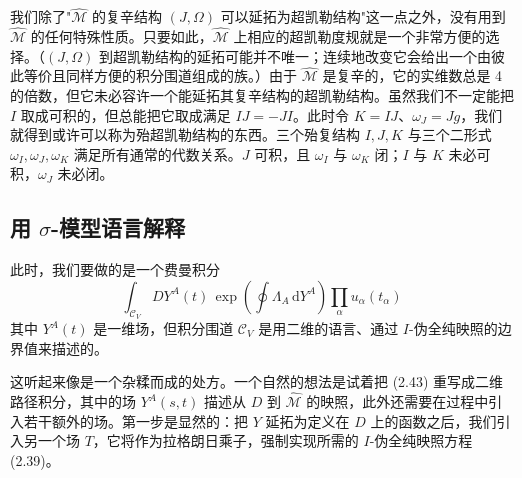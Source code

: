\documentclass[11pt,a4paper,UTF8]{ctexart}
\theoremstyle{plain}
\theoremstyle{definition}
\newcommand{\sigmatxt}{$\sigma$}
\begin{document}
我们除了"$\widehat{\mathcal{M}}$ 的复辛结构 $(J,\Omega)$ 可以延拓为超凯勒结构"这一点之外，没有用到 $\widehat{\mathcal{M}}$ 的任何特殊性质。只要如此，$\widehat{\mathcal{M}}$ 上相应的超凯勒度规就是一个非常方便的选择。（$(J,\Omega)$ 到超凯勒结构的延拓可能并不唯一；连续地改变它会给出一个由彼此等价且同样方便的积分围道组成的族。）由于 $\widehat{\mathcal{M}}$ 是复辛的，它的实维数总是 4 的倍数，但它未必容许一个能延拓其复辛结构的超凯勒结构。虽然我们不一定能把 $I$ 取成可积的，但总能把它取成满足 $IJ=-JI$。此时令 $K=IJ$、$\omega_J=Jg$，我们就得到或许可以称为殆超凯勒结构的东西。三个殆复结构 $I,J,K$ 与三个二形式 $\omega_I,\omega_J,\omega_K$ 满足所有通常的代数关系。$J$ 可积，且 $\omega_I$ 与 $\omega_K$ 闭；$I$ 与 $K$ 未必可积，$\omega_J$ 未必闭。


\subsection{用 \sigmatxt-模型语言解释}

此时，我们要做的是一个费曼积分
\begin{equation}
    \int_{\mathcal{C}_V} DY^A(t)\,\exp\left(\oint \Lambda_A\,\mathrm{d}Y^A\right)\prod_\alpha u_\alpha(t_\alpha)
    \tag{2.43}
\end{equation}
其中 $Y^A(t)$ 是一维场，但积分围道 $\mathcal{C}_V$ 是用二维的语言、通过 $I$-伪全纯映照的边界值来描述的。


这听起来像是一个杂糅而成的处方。一个自然的想法是试着把 (2.43) 重写成二维路径积分，其中的场 $Y^A(s,t)$ 描述从 $D$ 到 $\widehat{\mathcal{M}}$ 的映照，此外还需要在过程中引入若干额外的场。第一步是显然的：把 $Y$ 延拓为定义在 $D$ 上的函数之后，我们引入另一个场 $T$，它将作为拉格朗日乘子，强制实现所需的 $I$-伪全纯映照方程 (2.39)。
\end{document}
